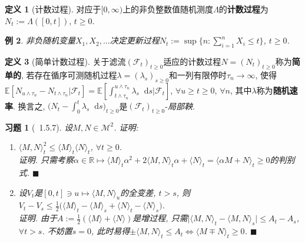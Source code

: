 \documentclass{ctexart}
\theoremstyle{definition}
\newtheorem{Def}{定义}[section]
\theoremstyle{remark}
\theoremstyle{plain}
\newtheorem{Eg}[Def]{例}
\newtheorem{Ex}{习题}[section]
\newenvironment{Prf}{\vspace{1ex}\textbf{\\}{\color{red}\textit{证明}}.\normalfont}{\color{red}\hfill$\blacksquare$\vspace{1ex}\par}
\newcommand{\1}{\mathbbm{1}}				%
\newcommand{\E}{\mathbb{E}}					%
\newcommand{\agp}[1]{\langle #1 \rangle}	%
\newcommand{\abs}[1]{\lvert#1\rvert}			%
\newcommand{\R}{\mathbb{R}}					%
\renewcommand*{\d}{\mathop{}\!\mathrm{d}}	%
\begin{document}
\begin{Def}[计数过程]
对应于$[0,\infty)$上的非负整数值随机测度$\Lambda$的\textbf{计数过程}为$N_{t} := \Lambda([0,t])$, $t \ge 0$.
\end{Def}

\begin{Eg}
非负随机变量$X_{1},X_{2},\dots$决定更新过程$N_{t} := \sup\{ n : \sum_{i=1}^{n} X_{i} \le t \}$, $t \ge 0$.
\end{Eg}

\begin{Def}[简单计数过程]
关于滤流$(\mathscr{F}_{t})_{t \ge 0}$适应的计数过程$N = (N_{t})_{t \ge 0}$称为\textbf{简单的}, 若存在循序可测随机过程$\lambda = (\lambda_{s})_{s \ge 0}$和一列有限停时$\tau_{n} \to \infty$, 使得$\E[N_{u\wedge\tau_{n}}-N_{t\wedge\tau_{n}}|\mathscr{F}_{t}] = \E[\int_{t\wedge\tau_{n}}^{u\wedge\tau_{n}} \lambda_{s} \d s |\mathscr{F}_{t}]$, $\forall u \ge t \ge 0$, $\forall n$, 其中$\lambda$称为\textbf{随机速率}. 换言之, $\big( N_{t} - \int_{0}^{t} \lambda_{s} \d s \big)_{t \ge 0}$是$(\mathscr{F}_{t})_{t \ge 0}$-\emph{局部鞅}.
\end{Def}


\begin{Ex}[\cite{Karatzas-Shreve--GTM113}~1.5.7]
设$M,N \in \mathcal{M}^2$. 证明:
\begin{enumerate}
\setlength{\itemsep}{0ex}
	\item $\agp{M,N}_{t}^{2} \le \agp{M}_{t} \agp{N}_{t}$, $\forall t \ge 0$.
\begin{Prf}
只需考察$\alpha \in \R \mapsto \agp{M}_{t}\alpha^{2} + 2\agp{M,N}_{t}\alpha + \agp{N}_{t} = \agp{\alpha M + N}_{t} \ge 0$的判别式.
\end{Prf}
	\item 设$V_{t}$是$[0,t] \owns u \mapsto \agp{M,N}_{u}$的全变差, $t > s$, 则$V_{t}-V_{s} \le \frac{1}{2}\big( \agp{M}_{t}-\agp{M}_{s} + \agp{N}_{t}-\agp{N}_{s} \big)$.
\begin{Prf}
由于$A := \frac{1}{2}(\agp{M}+\agp{N})$是增过程, 只需$\abs{\agp{M,N}_{t}-\agp{M,N}_{s}} \le A_{t}-A_{s}$, $\forall t > s$. 不妨置$s = 0$, 此时易得$\pm \agp{M,N}_{t} \le A_{t} \iff \agp{M \mp N}_{t} \ge 0$.
\end{Prf}
\end{enumerate}
\end{Ex}
\end{document}

